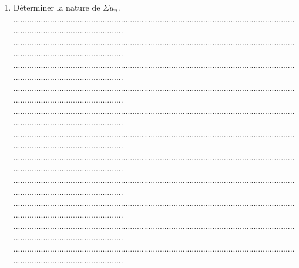 \documentclass{article}
\begin{document}
\begin{footnotesize}
\begin{enumerate}
    \item Déterminer la nature de $\Sigma u_{n}$.\newline\newline
    ...........................................................................................................................................................................\newline
    ...........................................................................................................................................................................\newline
    ...........................................................................................................................................................................\newline
    ...........................................................................................................................................................................\newline
    ...........................................................................................................................................................................\newline
    ...........................................................................................................................................................................\newline
    ...........................................................................................................................................................................\newline
    ...........................................................................................................................................................................\newline
    ...........................................................................................................................................................................\newline
    ...........................................................................................................................................................................\newline
    ...........................................................................................................................................................................\newline

\end{enumerate}
\end{footnotesize}
\end{document}
